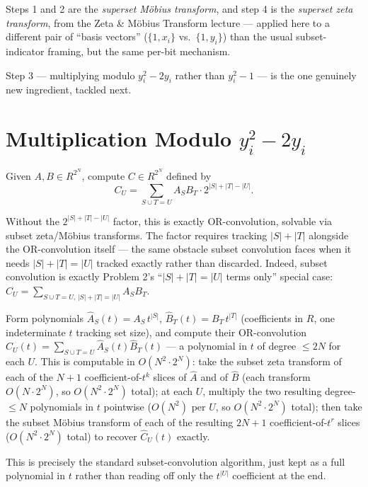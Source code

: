 \documentclass[11pt]{article}
\begin{document}
\begin{notebox}
Steps 1 and 2 are the \emph{superset M\"obius transform}, and step 4 is
the \emph{superset zeta transform}, from the Zeta \& M\"obius Transform
lecture --- applied here to a different pair of ``basis vectors''
($\{1,x_i\}$ vs.\ $\{1,y_i\}$) than the usual subset-indicator framing,
but the same per-bit mechanism.
\end{notebox}

Step 3 --- multiplying modulo $y_i^2-2y_i$ rather than $y_i^2-1$ --- is
the one genuinely new ingredient, tackled next.

\section{Multiplication Modulo \texorpdfstring{$y_i^2-2y_i$}{y\_i\^{}2 - 2y\_i}}
\begin{definitionbox}[Problem 2]
Given $A,B\in R^{2^N}$, compute $C\in R^{2^N}$ defined by
\[
  C_U = \sum_{S\cup T=U} A_SB_T\cdot 2^{|S|+|T|-|U|}.
\]
\end{definitionbox}
Without the $2^{|S|+|T|-|U|}$ factor, this is exactly OR-convolution,
solvable via subset zeta/M\"obius transforms. The factor requires
tracking $|S|+|T|$ alongside the OR-convolution itself --- the same
obstacle subset convolution faces when it needs $|S|+|T|=|U|$ tracked
exactly rather than discarded. Indeed, subset convolution is exactly
Problem 2's ``$|S|+|T|=|U|$ terms only'' special case:
$C_U = \sum_{S\cup T=U,\,|S|+|T|=|U|}A_SB_T$.

\begin{theorembox}
Form polynomials $\hat A_S(t) = A_S\,t^{|S|}$, $\hat B_T(t)=B_T\,t^{|T|}$
(coefficients in $R$, one indeterminate $t$ tracking set size), and
compute their OR-convolution
$\hat C_U(t) = \sum_{S\cup T=U}\hat A_S(t)\hat B_T(t)$ --- a polynomial
in $t$ of degree $\le 2N$ for each $U$. This is computable in
$O(N^2\cdot 2^N)$: take the subset zeta transform of each of the $N+1$
coefficient-of-$t^k$ slices of $\hat A$ and of $\hat B$ (each transform
$O(N\cdot2^N)$, so $O(N^2\cdot2^N)$ total); at each $U$, multiply the two
resulting degree-$\le N$ polynomials in $t$ pointwise ($O(N^2)$ per $U$,
so $O(N^2\cdot2^N)$ total); then take the subset M\"obius transform of
each of the resulting $2N+1$ coefficient-of-$t^r$ slices
($O(N^2\cdot2^N)$ total) to recover $\hat C_U(t)$ exactly.
\end{theorembox}
This is precisely the standard subset-convolution algorithm, just kept
as a full polynomial in $t$ rather than reading off only the
$t^{|U|}$ coefficient at the end.
\end{document}
